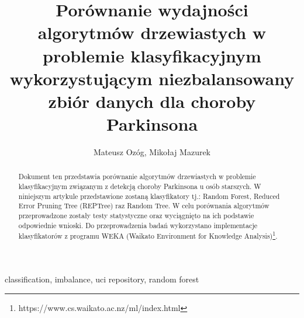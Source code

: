 \documentclass[conference]{IEEEtran}
\begin{document}
\title{Porównanie wydajności algorytmów drzewiastych w problemie klasyfikacyjnym wykorzystującym niezbalansowany zbiór danych dla choroby Parkinsona}

\author{Mateusz Ozóg, Mikołaj Mazurek}


\maketitle
\thispagestyle{plain}
\pagestyle{plain}

\begin{abstract}
Dokument ten przedstawia porównanie algorytmów drzewiastych w problemie klasyfikacyjnym związanym z detekcją choroby Parkinsona u osób starszych. W niniejszym artykule przedstawione zostaną klasyfikatory tj.: Random Forest, Reduced Error Pruning Tree (REPTree) raz Random Tree. W celu porównania algorytmów przeprowadzone zostały testy statystyczne oraz wyciągnięto na ich podstawie odpowiednie wnioski. Do przeprowadzenia badań wykorzystano implementacje klasyfikatorów z programu WEKA (Waikato Environment for Knowledge Analysis)\footnote{https://www.cs.waikato.ac.nz/ml/index.html}.
\end{abstract}

\begin{IEEEkeywords}
classification, imbalance, uci repository, random forest
\end{IEEEkeywords}
\end{document}
